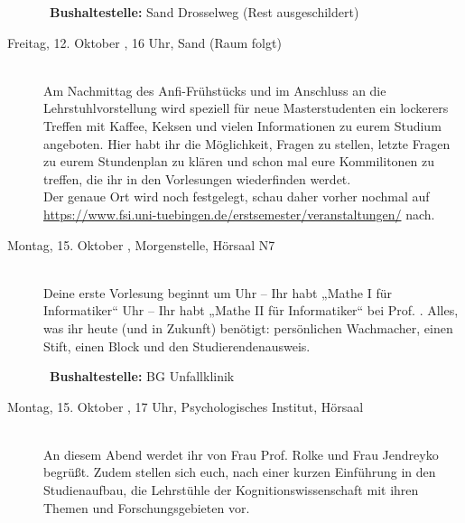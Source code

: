 \begin{description}
~\textbf{Bushaltestelle:} Sand Drosselweg (Rest ausgeschildert)

\ifmaster
\item[Freitag, 12. Oktober \Jahr, 16 Uhr, Sand (Raum folgt)]\ \\
Am Nachmittag des Anfi-Frühstücks und im Anschluss an die Lehrstuhlvorstellung wird speziell für neue Masterstudenten ein lockerers Treffen mit Kaffee, Keksen und vielen Informationen zu eurem Studium angeboten.
Hier habt ihr die Möglichkeit, Fragen zu stellen, letzte Fragen zu eurem Stundenplan zu klären und schon mal eure Kommilitonen zu treffen, die ihr in den Vorlesungen wiederfinden werdet. \\
Der genaue Ort wird noch festgelegt, schau daher vorher nochmal auf \url{https://www.fsi.uni-tuebingen.de/erstsemester/veranstaltungen/} nach.
\fi

\ifbachelor
\item[Montag, 15. Oktober \Jahr, Morgenstelle, Hörsaal N7]\ \\
Deine erste Vorlesung beginnt um
 Uhr -- Ihr habt „Mathe I für Informatiker“  \fi
{} Uhr -- Ihr habt „Mathe II für Informatiker“  \fi
bei Prof. \Matheprof.
Alles, was ihr heute (und in Zukunft) benötigt: persönlichen Wachmacher, einen Stift, einen Block und den Studierendenausweis.

~\textbf{Bushaltestelle:} BG Unfallklinik
\fi





\ifkogwiss
\ifbachelor
\item[Montag, 15. Oktober \Jahr, 17 Uhr, Psychologisches Institut, Hörsaal]\ \\
An diesem Abend werdet ihr von Frau Prof. Rolke und Frau Jendreyko begrüßt. Zudem stellen sich euch, nach einer kurzen Einführung in den Studienaufbau, die Lehrstühle der Kognitionswissenschaft mit ihren Themen und Forschungsgebieten vor.
\fi


\end{description}
